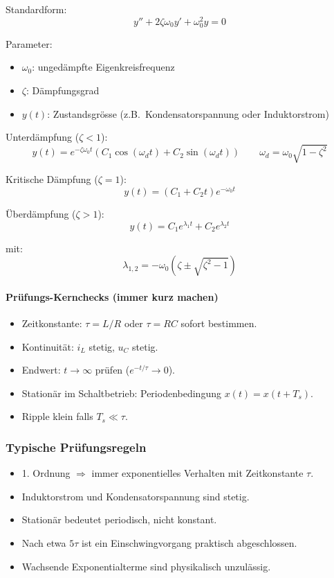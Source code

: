 Standardform:
\[
\boxed{
y''+2\zeta\omega_0 y'+\omega_0^2 y=0
}
\]

Parameter:
\begin{itemize}
\item $\omega_0$: ungedämpfte Eigenkreisfrequenz
\item $\zeta$: Dämpfungsgrad
\item $y(t)$: Zustandsgrösse (z.B.\ Kondensatorspannung oder Induktorstrom)
\end{itemize}

Unterdämpfung ($\zeta<1$):
\[
\boxed{
y(t)=e^{-\zeta\omega_0 t}\left(C_1\cos(\omega_d t)+C_2\sin(\omega_d t)\right)
}
\qquad
\boxed{\omega_d=\omega_0\sqrt{1-\zeta^2}}
\]

Kritische Dämpfung ($\zeta=1$):
\[
\boxed{y(t)=(C_1+C_2 t)e^{-\omega_0 t}}
\]

Überdämpfung ($\zeta>1$):
\[
\boxed{y(t)=C_1 e^{\lambda_1 t}+C_2 e^{\lambda_2 t}}
\]

mit:
\[
\boxed{\lambda_{1,2}=-\omega_0\left(\zeta\pm\sqrt{\zeta^2-1}\right)}
\]


\paragraph{Prüfungs-Kernchecks (immer kurz machen)}

\begin{itemize}
\item Zeitkonstante: $\tau=L/R$ oder $\tau=RC$ sofort bestimmen.
\item Kontinuität: $i_L$ stetig, $u_C$ stetig.
\item Endwert: $t\to\infty$ prüfen ($e^{-t/\tau}\to 0$).
\item Stationär im Schaltbetrieb: Periodenbedingung $x(t)=x(t+T_s)$.
\item Ripple klein falls $T_s\ll\tau$.
\end{itemize}

\subsubsection{Typische Prüfungsregeln}

\begin{itemize}
    \item 1. Ordnung $\Rightarrow$ immer exponentielles Verhalten mit Zeitkonstante $\tau$.
    \item Induktorstrom und Kondensatorspannung sind stetig.
    \item Stationär bedeutet periodisch, nicht konstant.
    \item Nach etwa $5\tau$ ist ein Einschwingvorgang praktisch abgeschlossen.
    \item Wachsende Exponentialterme sind physikalisch unzulässig.
\end{itemize}

